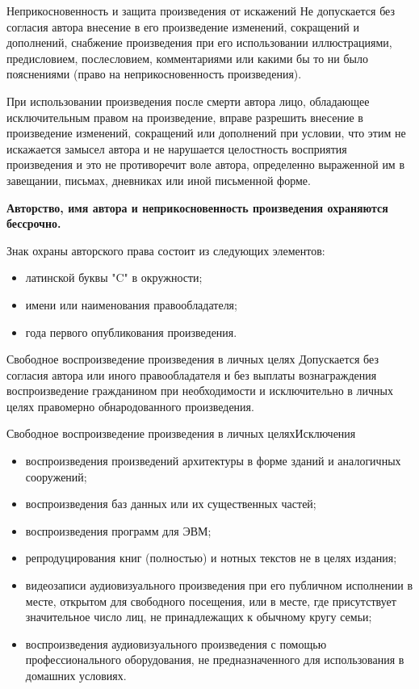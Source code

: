 \documentclass[_Venture_p2.tex]{subfiles}
\begin{document}
\begin{frame}[allowframebreaks]{Неприкосновенность и защита произведения от искажений}
Не допускается без согласия автора внесение в его произведение изменений, сокращений и дополнений, снабжение произведения при его использовании иллюстрациями, предисловием, послесловием, комментариями или какими бы то ни было пояснениями (право на неприкосновенность произведения).

\pagebreak
При использовании произведения после смерти автора лицо, обладающее исключительным правом на произведение, вправе разрешить внесение в произведение изменений, сокращений или дополнений при условии, что этим не искажается замысел автора и не нарушается целостность восприятия произведения и это не противоречит воле автора, определенно выраженной им в завещании, письмах, дневниках или иной письменной форме.

\textbf{Авторство, имя автора и неприкосновенность произведения охраняются бессрочно.}
\end{frame}

\begin{frame}{Знак охраны авторского права}
состоит из следующих элементов:
\begin{itemize}
	\item латинской буквы "C" в окружности;
	\item имени или наименования правообладателя;
	\item года первого опубликования произведения.
\end{itemize}
\end{frame}

\begin{frame}{Свободное воспроизведение произведения в личных целях}
Допускается без согласия автора или иного правообладателя и без выплаты вознаграждения воспроизведение гражданином при необходимости и исключительно в личных целях правомерно обнародованного произведения.
\end{frame}

\begin{frame}[allowframebreaks]{\setfontsize{12pt}Свободное воспроизведение произведения в личных целях}{Исключения}
\begin{itemize}
	\item воспроизведения произведений архитектуры в форме зданий и аналогичных сооружений;
	\item воспроизведения баз данных или их существенных частей;
	\item воспроизведения программ для ЭВМ;
	\item репродуцирования книг (полностью) и нотных текстов не в целях издания;
	
	\pagebreak
	\item видеозаписи аудиовизуального произведения при его публичном исполнении в месте, открытом для свободного посещения, или в месте, где присутствует значительное число лиц, не принадлежащих к обычному кругу семьи;
	\item воспроизведения аудиовизуального произведения с помощью профессионального оборудования, не предназначенного для использования в домашних условиях.
\end{itemize}
\end{frame}
\end{document}
